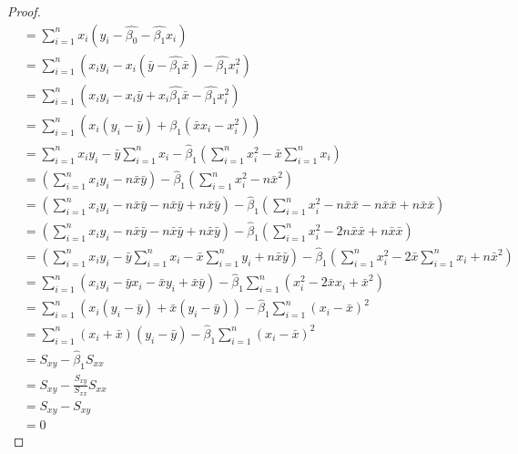 \documentclass[12pt]{article}
\begin{document}
\begin{enumerate}[1.]
\begin{enumerate}[(a)]
\begin{proof}
\begin{align*}
                    &= \sum_{i=1}^{n} x_i (y_i - \hat{\beta_0} - \hat{\beta_1} x_i) \\
                    &= \sum_{i=1}^{n} (x_i y_i - x_i (\bar{y} - \hat{\beta_1}\bar{x}) - \hat{\beta_1} x_i^2) \\
                    &= \sum_{i=1}^{n} (x_i y_i - x_i\bar{y} + x_i\hat{\beta_1}\bar{x} - \hat{\beta_1} x_i^2) \\
                    &= \sum_{i=1}^{n} (x_i(y_i - \bar{y}) + \hat{\beta_1}(\bar{x}x_i - x_i^2)) \\
                    &= \sum_{i=1}^n x_i y_i - \bar{y} \sum_{i=1}^n x_i - \hat{\beta}_1 \left( \sum_{i=1}^n x_i^2 - \bar{x} \sum_{i=1}^n x_i \right) \\
                    &= \left( \sum_{i=1}^n x_i y_i - n \bar{x} \bar{y} \right) - \hat{\beta}_1 \left( \sum_{i=1}^n x_i^2 - n \bar{x}^2 \right) \\
                    &= \left( \sum_{i=1}^n x_i y_i - n \bar{x} \bar{y} - n \bar{x} \bar{y} + n \bar{x} \bar{y} \right) - \hat{\beta}_1 \left( \sum_{i=1}^n x_i^2 -  n \bar{x}\bar{x} -  n \bar{x}\bar{x} + n \bar{x}\bar{x} \right) \\
                    &= \left( \sum_{i=1}^n x_i y_i - n \bar{x} \bar{y} - n \bar{x} \bar{y} + n \bar{x} \bar{y} \right) - \hat{\beta}_1 \left( \sum_{i=1}^n x_i^2 - 2 n \bar{x}\bar{x} + n \bar{x}\bar{x} \right) \\
                    &= \left( \sum_{i=1}^n x_i y_i - \bar{y}\sum_{i=1}^n x_i - \bar{x}\sum_{i=1}^n y_i + n \bar{x} \bar{y} \right) - \hat{\beta}_1 \left( \sum_{i=1}^n x_i^2 - 2\bar{x}\sum_{i=1}^n x_i + n \bar{x}^2 \right) \\
                    &= \sum_{i=1}^n \left(  x_i y_i - \bar{y}x_i - \bar{x}y_i + \bar{x}\bar{y} \right) - \hat{\beta}_1 \sum_{i=1}^n \left( x_i^2 - 2\bar{x} x_i + \bar{x}^2 \right) \\
                    &= \sum_{i=1}^n \left(  x_i (y_i - \bar{y}) + \bar{x}(y_i - \bar{y}) \right) - \hat{\beta}_1 \sum_{i=1}^n (x_i - \bar{x})^2 \\
                    &= \sum_{i=1}^n (x_i + \bar{x})(y_i - \bar{y}) - \hat{\beta}_1 \sum_{i=1}^n (x_i - \bar{x})^2 \\
                    &= S_{xy} - \hat{\beta}_1 S_{xx} \\
                    &= S_{xy} - \frac{S_{xy}}{S_{xx}} S_{xx} \\
                    &= S_{xy} - S_{xy} \\
                    &= 0

\end{align*}
\end{proof}
\end{enumerate}
\end{enumerate}
\end{document}
